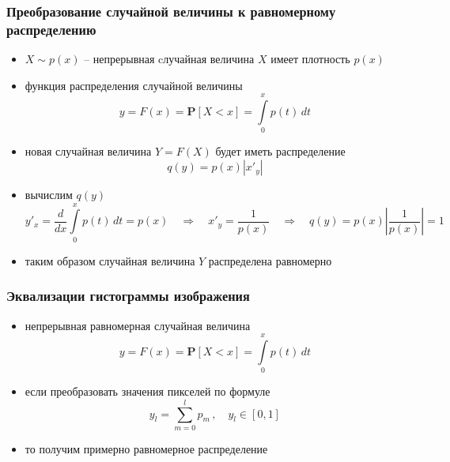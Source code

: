 \documentclass[12pt,usepdftitle=false,aspectratio=1610]{beamer}
\begin{document}
\begin{frame}
    \frametitle{Преобразование случайной величины к равномерному распределению}
    \begin{itemize}
        \item $X \sim p(x)$ -- непрерывная cлучайная величина $X$ имеет плотность $p(x)$
        \item функция распределения случайной величины
        $$
            y=F(x)=\mathbf{P}[X<x]=\int\limits_0^xp(t)\,dt
        $$
        \item новая случайная величина $Y=F\left(X\right)$ будет иметь распределение
        $$
            q(y)=p(x)\left|x'_y\right|
        $$
        \item вычислим $q(y)$
        $$
            y'_x=\frac{d}{dx}\int\limits_0^xp(t)\,dt=p(x)
            \quad\Rightarrow\quad 
            x'_y=\frac{1}{p(x)}
            \quad\Rightarrow\quad
            q(y)=p(x)\left|\frac{1}{p(x)}\right|=1
        $$
        \item таким образом случайная величина $Y$ распределена равномерно
    \end{itemize}
\end{frame}

\begin{frame}
    \frametitle{Эквализации гистограммы изображения}
    \begin{itemize}
        \item непрерывная равномерная случайная величина
        $$
            y=F(x)=\mathbf{P}[X<x]=\int\limits_0^xp(t)\,dt
        $$
        \item если преобразовать значения пикселей по формуле
        $$
            y_l=\sum_{m=0}^l p_m\,,\quad y_l\in[0,1]
        $$
        \item то получим примерно равномерное распределение
    \end{itemize}
\end{frame}
\end{document}
